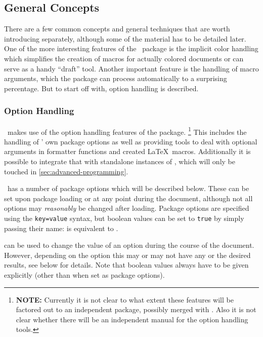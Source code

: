 \documentclass[12pt]{scrartcl}
\begin{document}
\subsection{General Concepts}
\label{sec:intro:general-concepts}

There are a few common concepts and general techniques that are worth introducing separately,
although some of the material has to be detailed later.  One of the more
interesting features of the \luatemplates\ package is the implicit color
handling which simplifies the creation of macros for actually colored documents
or can serve as a handy “draft” tool.  Another important feature is the handling
of macro arguments, which the package can process automatically to a surprising
percentage.  But to start off with, option handling is described.


\subsubsection{Option Handling}
\label{sec:option-handling}

\luatemplates\ makes use of the option handling features of the
 package.%
\footnote{\textbf{NOTE:} Currently it is not clear to what extent these features will
be factored out to an independent package, possibly merged with \luatemplates.
Also it is not clear whether there will be an independent manual for the option handling
tools.} %
This includes the handling of \luatemplates' own package options as
well as providing tools to deal with optional arguments in formatter functions
and created \LaTeX\ macros.  Additionally it is possible to integrate that with
standalone instances of , which will only be touched in
\vref{sec:advanced-programming}.

\luatemplates\ has a number of package options which will be described
below.  These can be set upon package loading or at any point during the
document, although not all options may \emph{reasonably} be changed after
loading.  Package options are specified using the \texttt{key=value} syntax, but
boolean values can be set to \texttt{true} by simply passing their name:
\luavar{[color]} is equivalent to \luavar{[color=true]}.

 can be used to change the value of
an option during the course of the document.  However, depending on the option
this may or may not have any or the desired results, see below for details.
Note that boolean values always have to be given explicitly (other than when set
as package options).
\end{document}
